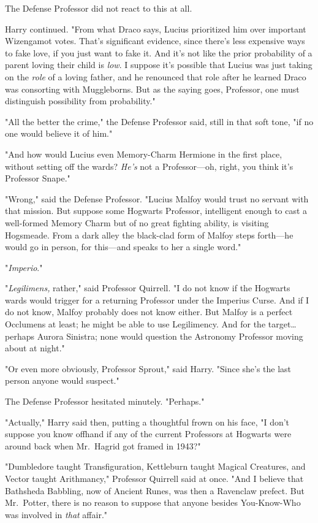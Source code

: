 The Defense Professor did not react to this at all.

Harry continued. "From what Draco says, Lucius prioritized him over important
Wizengamot votes. That's significant evidence, since there's less expensive
ways to fake love, if you just want to fake it. And it's not like the prior
probability of a parent loving their child is \emph{low}. I suppose it's
possible that Lucius was just taking on the \emph{role} of a loving father, and
he renounced that role after he learned Draco was consorting with Muggleborns.
But as the saying goes, Professor, one must distinguish possibility from
probability."

"All the better the crime," the Defense Professor said, still in that soft
tone, "if no one would believe it of him."

"And how would Lucius even Memory-Charm Hermione in the first place, without
setting off the wards? \emph{He's} not a Professor---oh, right, you think it's
Professor Snape."

"Wrong," said the Defense Professor. "Lucius Malfoy would trust no servant with
that mission. But suppose some Hogwarts Professor, intelligent enough to cast a
well-formed Memory Charm but of no great fighting ability, is visiting
Hogsmeade. From a dark alley the black-clad form of Malfoy steps forth---he
would go in person, for this---and speaks to her a single word."

"\emph{Imperio}."

"\emph{Legilimens,} rather," said Professor Quirrell. "I do not know if the
Hogwarts wards would trigger for a returning Professor under the Imperius
Curse. And if I do not know, Malfoy probably does not know either. But Malfoy
is a perfect Occlumens at least; he might be able to use Legilimency. And for
the target{\ldots}perhaps Aurora Sinistra; none would question the Astronomy
Professor moving about at night."

"Or even more obviously, Professor Sprout," said Harry. "Since she's the last
person anyone would suspect."

The Defense Professor hesitated minutely. "Perhaps."

"Actually," Harry said then, putting a thoughtful frown on his face, "I don't
suppose you know offhand if any of the current Professors at Hogwarts were
around back when Mr.~Hagrid got framed in 1943?"

"Dumbledore taught Transfiguration, Kettleburn taught Magical Creatures, and
Vector taught Arithmancy," Professor Quirrell said at once. "And I believe that
Bathsheda Babbling, now of Ancient Runes, was then a Ravenclaw prefect. But
Mr.~Potter, there is no reason to suppose that anyone besides You-Know-Who was
involved in \emph{that} affair."

